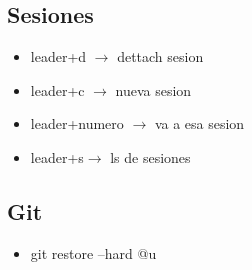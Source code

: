 \documentclass[a4paper,10pt]{article}
\begin{document}
\subsection{Sesiones}
\begin{itemize}
  \item leader+d $\to$ dettach sesion
  \item leader+c $\to$ nueva sesion
  \item leader+numero $\to$ va a esa sesion
  \item leader+s$\to$ ls de sesiones
\end{itemize}

\subsection{Git}
\begin{itemize}
    \item git restore --hard @{u}
\end{itemize}
\end{document}
